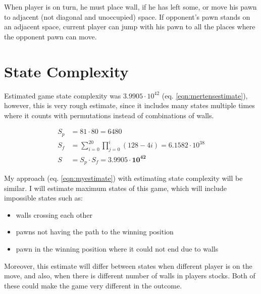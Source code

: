 When player is on turn, he must place wall, if he has left some, or move
his pawn to adjacent (not diagonal and unoccupied) space.
If opponent's pawn stands on an adjacent space, current player can jump
with his pawn to all the places where the opponent pawn can move.

\section{State Complexity}
Estimated game state complexity was $3.9905\cdot10^{42}$
\cite{mertens} (eq. \ref{eqn:mertensestimate}), however, this is very
rough estimate, since it includes many states multiple times where it counts
with permutations instead of combinations of walls.

\begin{center}
  \vspace*{-1.30cm}
  \begin{equation}
    \label{eqn:mertensestimate}
    \begin{aligned}
      S_p\!&=\!81 \cdot 80 = 6480 \\
      S_f\!&=\!\sum_{i=0}^{20}\prod_{j=0}^{i}(128 - 4i)\!=\!6.1582{\cdot}10^{38} \\
      S\!&=\!S_p \cdot S_f = \mathbf{3.9905 \cdot 10 ^{42}}
    \end{aligned}
  \end{equation}
  \vspace*{-1.15cm}
\end{center}

My approach (eq. \ref{eqn:myestimate}) with estimating state complexity
will be similar. I will estimate maximum states of this game, which will
include impossible states such as:
\begin{itemize}
  \vspace*{-0.25cm}
  \setlength\itemsep{0cm}
  \item walls crossing each other
  \item pawns not having the path to the winning position
  \item pawn in the winning position where it could not end due to walls
  \vspace*{-0.15cm}
\end{itemize}
Moreover, this estimate will differ between states when different
player is on the move, and also, when there is different number of walls
in players stocks. Both of these could make the game very different
in the outcome.

